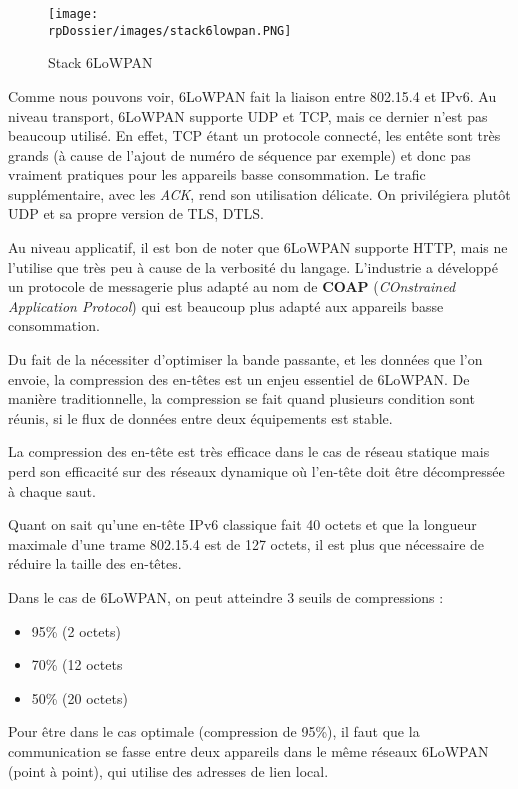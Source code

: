 \begin{figure}[H]
\centering
\texttt{[image: \\rpDossier/images/stack6lowpan.PNG]}
\caption{Stack 6LoWPAN}
\label{stack6lowpan}
\end{figure}

Comme nous pouvons voir, 6LoWPAN fait la liaison entre 802.15.4 et IPv6. Au niveau transport, 6LoWPAN supporte UDP et TCP, mais ce dernier n'est pas beaucoup utilisé. En effet, TCP étant un protocole connecté, les entête sont très grands (à cause de l'ajout de numéro de séquence par exemple) et donc pas vraiment pratiques pour les appareils basse consommation. Le trafic supplémentaire, avec les \textit{ACK}, rend son utilisation délicate. On privilégiera plutôt UDP et sa propre version de TLS, DTLS. 

Au niveau applicatif, il est bon de noter que 6LoWPAN supporte HTTP, mais ne l'utilise que très peu à cause de la verbosité du langage. L'industrie a développé un protocole de messagerie plus adapté au nom de \textbf{COAP} (\textit{COnstrained Application Protocol}) qui est beaucoup plus adapté aux appareils basse consommation.

Du fait de la nécessiter d'optimiser la bande passante, et les données que l'on envoie, la compression des en-têtes est un enjeu essentiel de 6LoWPAN. De manière traditionnelle, la compression se fait quand plusieurs condition sont réunis, si le flux de données entre deux équipements est stable.

La compression des en-tête est très efficace dans le cas de réseau statique mais perd son efficacité sur des réseaux dynamique où l'en-tête doit être décompressée à chaque saut.

Quant on sait qu'une en-tête IPv6 classique fait 40 octets et que la longueur maximale d'une trame 802.15.4 est de 127 octets, il est plus que nécessaire de réduire la taille des en-têtes.

Dans le cas de 6LoWPAN, on peut atteindre 3 seuils de compressions :
\begin{itemize}
\item 95\% (2 octets)
\item 70\% (12 octets
\item 50\% (20 octets)
\end{itemize}

Pour être dans le cas optimale (compression de 95\%), il faut que la communication se fasse entre deux appareils dans le même réseaux 6LoWPAN (point à point), qui utilise des adresses de lien local.

